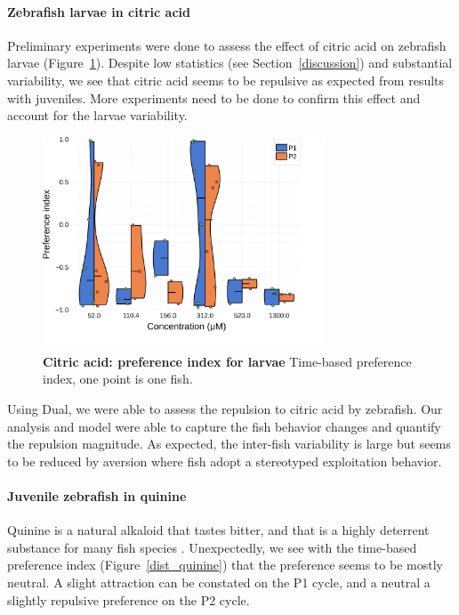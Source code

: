  \paragraph{Zebrafish larvae in citric acid} Preliminary experiments were done to assess the effect of citric acid on zebrafish larvae (Figure~\ref{dist_citric_acid_lar}). Despite low statistics (see Section~\ref{discussion}) and substantial variability, we see that citric acid seems to be repulsive as expected from results with juveniles. More experiments need to be done to confirm this effect and account for the larvae variability.

    \begin{figure}[h!]
      \centering
      \includegraphics[width=0.75\textwidth]{part_2/assets/dist_citricacid_lar.png}
      \caption{\textbf{Citric acid: preference index for larvae} Time-based preference index, one point is one fish.}
      \label{dist_citric_acid_lar}
    \end{figure}

  Using Dual, we were able to assess the repulsion to citric acid by zebrafish. Our analysis and model were able to capture the fish behavior changes and quantify the repulsion magnitude. As expected, the inter-fish variability is large but seems to be reduced by aversion where fish adopt a stereotyped exploitation behavior.

  \paragraph{Juvenile zebrafish in quinine} Quinine is a natural alkaloid that tastes bitter, and that is a highly deterrent substance for many fish species \cite{kasumyan2003taste}. Unexpectedly, we see with the time-based preference index (Figure~\ref{dist_quinine}) that the preference seems to be mostly neutral. A slight attraction can be constated on the P1 cycle, and a neutral a slightly repulsive preference on the P2 cycle.

